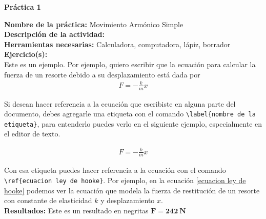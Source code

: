 \documentclass[spanish,12pt,letterpaper,twoside,openright]{report}
\begin{document}
	
	\newpage
	
	\textbf{Práctica 1}\\
	\vspace{1cm}
	\raggedright
	\textbf{Nombre de la práctica:} Movimiento Armónico Simple \\
	\textbf{Descripción de la actividad:}  \\
	\textbf{Herramientas necesarias:} Calculadora, computadora, lápiz, borrador  \\
	\vspace{1cm}
	\textbf{Ejercicio(s):} \\
	
	Este es un ejemplo. Por ejemplo, quiero escribir que la ecuación para calcular la fuerza de un resorte debido a su desplazamiento está dada por 
	\begin{align}
		F = -\frac{k}{m} x
	\end{align}
	
	Si desean hacer referencia a la ecuación que escribiste en alguna parte del documento, debes agregarle una etiqueta con el comando \texttt{\textbackslash label\{nombre de la etiqueta\}}, para entenderlo puedes verlo en el siguiente ejemplo, especialmente en el editor de texto. 
	
	\begin{align}
			F = -\frac{k}{m} x \label{ecuacion ley de hooke}
	\end{align}
	
	Con esa etiqueta puedes hacer referencia a la ecuación con el comando \texttt{\textbackslash ref\{ecuacion ley de hooke\}}. Por ejemplo, en la ecuación \ref{ecuacion ley de hooke} podemos ver la ecuación que modela la fuerza de restitución de un resorte con constante de elasticidad $k$ y desplazamiento $x$.\\
	
	
	\vspace{1cm}
	\textbf{Resultados:}  Este es un resultado en negritas $\mathbf{F = 242\ N}$
	
\end{document}
